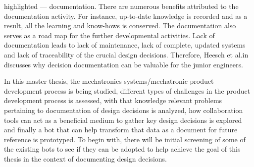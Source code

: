highlighted --- documentation. There are numerous benefits attributed to the documentation activity. For instance, up-to-date knowledge is recorded and as a result, all the learning and know-hows is conserved. The documentation also serves as a road map for the further developmental activities. Lack of documentation leads to lack of maintenance, lack of complete, updated systems and lack of traceability of the crucial design decisions. Therefore, Heesch et al.in \cite{van_heesch_does_2013} discusses why decision documentation can be valuable for the junior engineers.

In this master thesis, the mechatronics systems/mechatronic product development process is being studied, different types of challenges in the product development process is assessed, with that knowledge relevant problems pertaining to documentation of design decisions is analyzed, how collaboration tools can act as a beneficial medium to gather key design decisions is explored and finally a bot that can help transform that data as a document for future reference is prototyped. To begin with, there will be initial screening of some of the existing bots to see if they can be adopted to help achieve the goal of this thesis in the context of documenting design decisions.

